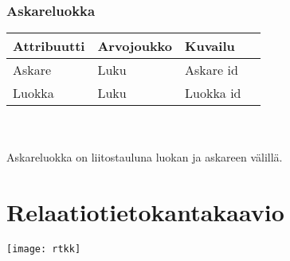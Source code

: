 \documentclass{report}
\begin{document}
\subsubsection*{Askareluokka}
\begin{tabular}{ | l | l | l | p{7.5cm} |} \hline
\textbf{Attribuutti} & \textbf{Arvojoukko} & \textbf{Kuvailu} \\ \hline
Askare & Luku & Askare id \\ \hline
Luokka & Luku & Luokka id \\ \hline
\end{tabular}
\\ \\ Askareluokka on liitostauluna luokan ja askareen välillä.

\section*{Relaatiotietokantakaavio}
\texttt{[image: rtkk]}
\end{document}

